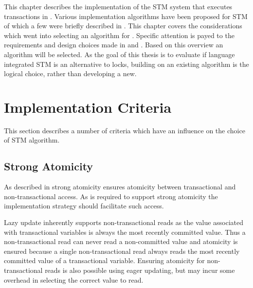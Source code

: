 \makeatletter {}\makeatother
{}
This chapter describes the implementation of the \ac{STM} system that executes transactions in \stmname. Various implementation algorithms have been proposed for \ac{STM} of which a few were briefly described in . This chapter covers the considerations which went into selecting an algorithm for \stmname. Specific attention is payed to the requirements and design choices made in  and . Based on this overview an algorithm will be selected. As the goal of this thesis is to evaluate if language integrated \ac{STM} is an alternative to locks, building on an existing algorithm is the logical choice, rather than developing a new.
\label{chap:implementation}
\section{Implementation Criteria}
\label{sec:stm_impl_criteria}
This section describes a number of criteria which have an influence on the choice of \ac{STM} algorithm.

\subsection{Strong Atomicity}
As described in  strong atomicity ensures atomicity between transactional and non-transactional access. As \stmnamesp is required to support strong atomicity the implementation strategy should facilitate such access.

Lazy update inherently supports non-transactional reads as the value associated with transactional variables is always the most recently committed value\cite[p. 2084]{herlihy2011tm}\cite[p. 21]{harris2010transactional}. Thus a non-transactional read can never read a non-committed value and atomicity is ensured because a single non-transactional read always reads the most recently committed value of a transactional variable. Ensuring atomicity for non-transactional reads is also possible using eager updating, but may incur some overhead in selecting the correct value to read. 

